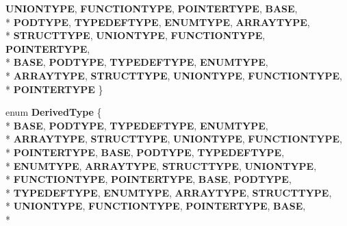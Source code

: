 \begin{DoxyCompactItemize}
{\bfseries U\-N\-I\-O\-N\-T\-Y\-P\-E}, 
{\bfseries F\-U\-N\-C\-T\-I\-O\-N\-T\-Y\-P\-E}, 
{\bfseries P\-O\-I\-N\-T\-E\-R\-T\-Y\-P\-E}, 
{\bfseries B\-A\-S\-E}, 
\\*
{\bfseries P\-O\-D\-T\-Y\-P\-E}, 
{\bfseries T\-Y\-P\-E\-D\-E\-F\-T\-Y\-P\-E}, 
{\bfseries E\-N\-U\-M\-T\-Y\-P\-E}, 
{\bfseries A\-R\-R\-A\-Y\-T\-Y\-P\-E}, 
\\*
{\bfseries S\-T\-R\-U\-C\-T\-T\-Y\-P\-E}, 
{\bfseries U\-N\-I\-O\-N\-T\-Y\-P\-E}, 
{\bfseries F\-U\-N\-C\-T\-I\-O\-N\-T\-Y\-P\-E}, 
{\bfseries P\-O\-I\-N\-T\-E\-R\-T\-Y\-P\-E}, 
\\*
{\bfseries B\-A\-S\-E}, 
{\bfseries P\-O\-D\-T\-Y\-P\-E}, 
{\bfseries T\-Y\-P\-E\-D\-E\-F\-T\-Y\-P\-E}, 
{\bfseries E\-N\-U\-M\-T\-Y\-P\-E}, 
\\*
{\bfseries A\-R\-R\-A\-Y\-T\-Y\-P\-E}, 
{\bfseries S\-T\-R\-U\-C\-T\-T\-Y\-P\-E}, 
{\bfseries U\-N\-I\-O\-N\-T\-Y\-P\-E}, 
{\bfseries F\-U\-N\-C\-T\-I\-O\-N\-T\-Y\-P\-E}, 
\\*
{\bfseries P\-O\-I\-N\-T\-E\-R\-T\-Y\-P\-E}
 \}
\item 
enum {\bfseries Derived\-Type} \{ \\*
{\bfseries B\-A\-S\-E}, 
{\bfseries P\-O\-D\-T\-Y\-P\-E}, 
{\bfseries T\-Y\-P\-E\-D\-E\-F\-T\-Y\-P\-E}, 
{\bfseries E\-N\-U\-M\-T\-Y\-P\-E}, 
\\*
{\bfseries A\-R\-R\-A\-Y\-T\-Y\-P\-E}, 
{\bfseries S\-T\-R\-U\-C\-T\-T\-Y\-P\-E}, 
{\bfseries U\-N\-I\-O\-N\-T\-Y\-P\-E}, 
{\bfseries F\-U\-N\-C\-T\-I\-O\-N\-T\-Y\-P\-E}, 
\\*
{\bfseries P\-O\-I\-N\-T\-E\-R\-T\-Y\-P\-E}, 
{\bfseries B\-A\-S\-E}, 
{\bfseries P\-O\-D\-T\-Y\-P\-E}, 
{\bfseries T\-Y\-P\-E\-D\-E\-F\-T\-Y\-P\-E}, 
\\*
{\bfseries E\-N\-U\-M\-T\-Y\-P\-E}, 
{\bfseries A\-R\-R\-A\-Y\-T\-Y\-P\-E}, 
{\bfseries S\-T\-R\-U\-C\-T\-T\-Y\-P\-E}, 
{\bfseries U\-N\-I\-O\-N\-T\-Y\-P\-E}, 
\\*
{\bfseries F\-U\-N\-C\-T\-I\-O\-N\-T\-Y\-P\-E}, 
{\bfseries P\-O\-I\-N\-T\-E\-R\-T\-Y\-P\-E}, 
{\bfseries B\-A\-S\-E}, 
{\bfseries P\-O\-D\-T\-Y\-P\-E}, 
\\*
{\bfseries T\-Y\-P\-E\-D\-E\-F\-T\-Y\-P\-E}, 
{\bfseries E\-N\-U\-M\-T\-Y\-P\-E}, 
{\bfseries A\-R\-R\-A\-Y\-T\-Y\-P\-E}, 
{\bfseries S\-T\-R\-U\-C\-T\-T\-Y\-P\-E}, 
\\*
{\bfseries U\-N\-I\-O\-N\-T\-Y\-P\-E}, 
{\bfseries F\-U\-N\-C\-T\-I\-O\-N\-T\-Y\-P\-E}, 
{\bfseries P\-O\-I\-N\-T\-E\-R\-T\-Y\-P\-E}, 
{\bfseries B\-A\-S\-E}, 
\\*

\end{DoxyCompactItemize}
